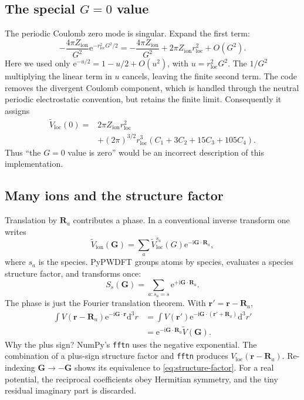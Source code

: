 \documentclass[10pt,twocolumn]{article}
\newcommand{\ii}{\mathrm{i}}
\newcommand{\e}{\mathrm{e}}
\newcommand{\dd}{\mathrm{d}}
\newcommand{\vloc}{V_{\mathrm{loc}}}
\newcommand{\zion}{Z_{\mathrm{ion}}}
\newcommand{\gvec}{\mathbf G}
\newcommand{\rvec}{\mathbf r}
\newcommand{\Rvec}{\mathbf R}
\newcommand{\code}[1]{\texttt{#1}}
\begin{document}
\subsection{The special \texorpdfstring{\(G=0\)}{G=0} value}

The periodic Coulomb zero mode is singular.  Expand the first term:
\begin{equation}
-\frac{4\pi\zion}{G^2}\e^{-r_{\mathrm{loc}}^2G^2/2}
=-\frac{4\pi\zion}{G^2}
+2\pi\zion r_{\mathrm{loc}}^2+O(G^2).
\end{equation}
Here we used only
\(\e^{-u/2}=1-u/2+O(u^2)\), with
\(u=r_{\mathrm{loc}}^2G^2\).  The \(1/G^2\) multiplying the linear term in
\(u\) cancels, leaving the finite second term.
The code removes the divergent Coulomb component, which is handled through
the neutral periodic electrostatic convention, but retains the finite limit.
Consequently it assigns
\begin{align}
\widetilde V_{\mathrm{loc}}(0)
={}&2\pi\zion r_{\mathrm{loc}}^2
\nonumber\\
&+(2\pi)^{3/2}r_{\mathrm{loc}}^3
(C_1+3C_2+15C_3+105C_4).
\label{eq:gzero}
\end{align}
Thus ``the \(G=0\) value is zero'' would be an incorrect description of this
implementation.

\subsection{Many ions and the structure factor}

Translation by \(\Rvec_a\) contributes a phase.  In a conventional inverse
transform one writes
\begin{equation}
\widetilde V_{\mathrm{ion}}(\gvec)
=\sum_a\widetilde V_{\mathrm{loc}}^{s_a}(G)
\e^{-\ii\gvec\cdot\Rvec_a},
\label{eq:structure-factor}
\end{equation}
where \(s_a\) is the species.  PyPWDFT groups atoms by species, evaluates a
species structure factor, and transforms once:
\begin{equation}
S_s(\gvec)=\sum_{a:s_a=s}\e^{+\ii\gvec\cdot\Rvec_a}.
\end{equation}
The phase is just the Fourier translation theorem.  With
\(\rvec'=\rvec-\Rvec_a\),
\begin{align}
\int V(\rvec-\Rvec_a)\e^{-\ii\gvec\cdot\rvec}\dd^3r
&=\int V(\rvec')\e^{-\ii\gvec\cdot(\rvec'+\Rvec_a)}
\dd^3r'\nonumber\\
&=\e^{-\ii\gvec\cdot\Rvec_a}\widetilde V(\gvec).
\end{align}
Why the plus sign?  NumPy's \code{fftn} uses the negative exponential.  The
combination of a plus-sign structure factor and \code{fftn} produces
\(\vloc(\rvec-\Rvec_a)\).  Re-indexing \(\gvec\to-\gvec\) shows its
equivalence to \cref{eq:structure-factor}.  For a real potential, the
reciprocal coefficients obey Hermitian symmetry, and the tiny residual
imaginary part is discarded.
\end{document}
